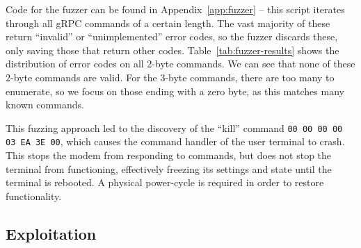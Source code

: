 Code for the fuzzer can be found in Appendix~\ref{app:fuzzer} -- this script iterates through all gRPC commands of a certain length.
The vast majority of these return ``invalid'' or ``unimplemented'' error codes, so the fuzzer discards these, only saving those that return other codes.
Table~\ref{tab:fuzzer-results} shows the distribution of error codes on all 2-byte commands.
We can see that none of these 2-byte commands are valid.
For the 3-byte commands, there are too many to enumerate, so we focus on those ending with a zero byte, as this matches many known commands.

This fuzzing approach led to the discovery of the ``kill'' command \lstinline{00 00 00 00 03 EA 3E 00}, which causes the command handler of the user terminal to crash.
This stops the modem from responding to commands, but does not stop the terminal from functioning, effectively freezing its settings and state until the terminal is rebooted.
A physical power-cycle is required in order to restore functionality.


\subsection{Exploitation}\label{sec:exploitation}

